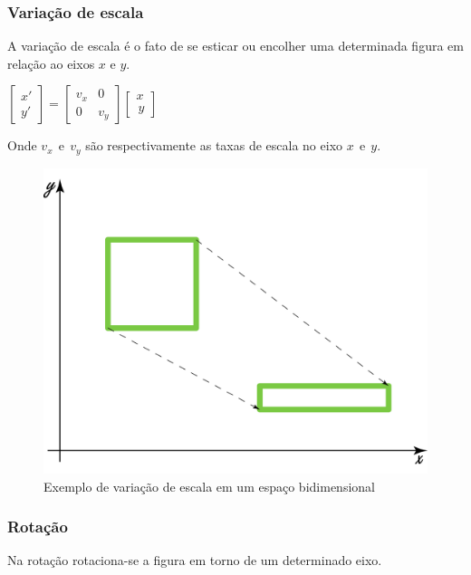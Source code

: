\documentclass[9pt, a4paper, nofonttune, journal]{IEEEtran}
\begin{document}
\subsubsection{Variação de escala}

A variação de escala é o fato de se esticar ou encolher uma determinada figura em relação ao eixos $x$ e $y$.

\begin{center}
$\begin{bmatrix}x'\\
y'
\end{bmatrix}=\begin{bmatrix}v_{x} & 0\\
0 & v_{y}
\end{bmatrix}\begin{bmatrix}x\\
\frac{}{}y
\end{bmatrix}$\end{center}
Onde $v_{x}~~ \textrm{e} ~~ v_{y}$ são respectivamente as taxas de escala no eixo $x~~ \textrm{e} ~~y$.\cite{CGPPBook1}


\begin{figure}[H]
\begin{center}
\includegraphics[scale=0.25]{figuras/scale1}
\caption{Exemplo de variação de escala em um espaço bidimensional}
\end{center}
\end{figure}

\subsubsection{Rotação}
Na rotação rotaciona-se a figura em torno de um determinado eixo.
\end{document}
